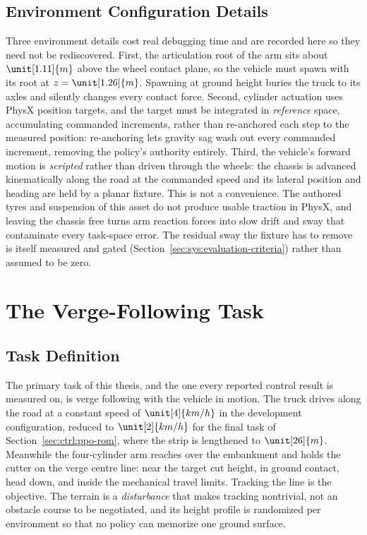 \subsection{Environment Configuration Details}

Three environment details cost real debugging time and are recorded
here so they need not be rediscovered. First, the articulation root of
the arm sits about $\unit[1.11]{m}$ above the wheel contact plane, so
the vehicle must spawn with its root at $z = \unit[1.26]{m}$. Spawning
at ground height buries the truck to its axles and silently changes
every contact force. Second, cylinder actuation uses PhysX position
targets, and the target must be integrated in \emph{reference} space,
accumulating commanded increments, rather than re-anchored each step to
the measured position: re-anchoring lets gravity sag wash out every
commanded increment, removing the policy's authority entirely. Third,
the vehicle's forward motion is \emph{scripted} rather than driven
through the wheels: the chassis is advanced kinematically along the road
at the commanded speed and its lateral position and heading are held by
a planar fixture. This is not a convenience. The authored tyres and
suspension of this asset do not produce usable traction in PhysX, and
leaving the chassis free turns arm reaction forces into slow drift and
sway that contaminate every task-space error. The residual sway the
fixture has to remove is itself measured and gated
(Section~\ref{sec:sys:evaluation-criteria}) rather than assumed to be
zero.

\section{The Verge-Following Task}
\label{sec:sys:task}

\subsection{Task Definition}

The primary task of this thesis, and the one every reported control
result is measured on, is verge following with the vehicle in motion.
The truck drives along the road at a constant speed of $\unit[4]{km/h}$
in the development configuration, reduced to $\unit[2]{km/h}$ for the
final \ppoROM{} task of Section~\ref{sec:ctrl:ppo-rom}, where the strip
is lengthened to $\unit[26]{m}$. Meanwhile the
four-cylinder arm reaches over the embankment and holds the cutter on
the verge centre line: near the target cut height, in ground contact,
head down, and inside the mechanical travel limits. Tracking the line is
the objective. The terrain is a \emph{disturbance} that makes tracking
nontrivial, not an obstacle course to be negotiated, and its height
profile is randomized per environment so that no policy can memorize one
ground surface.

